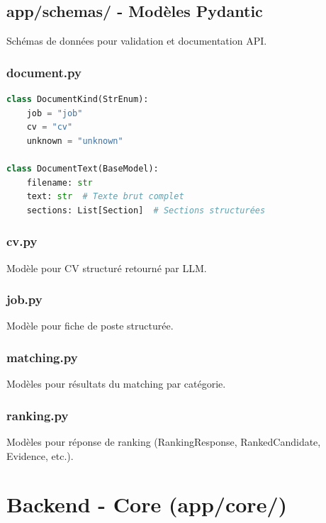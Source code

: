 \documentclass[12pt,a4paper,oneside]{book}
\begin{document}
\subsection{app/schemas/ - Modèles Pydantic}

Schémas de données pour validation et documentation API.

\subsubsection{document.py}

\begin{lstlisting}[language=Python]
class DocumentKind(StrEnum):
    job = "job"
    cv = "cv"
    unknown = "unknown"

class DocumentText(BaseModel):
    filename: str
    text: str  # Texte brut complet
    sections: List[Section]  # Sections structurées
\end{lstlisting}

\subsubsection{cv.py}

Modèle pour CV structuré retourné par LLM.

\subsubsection{job.py}

Modèle pour fiche de poste structurée.

\subsubsection{matching.py}

Modèles pour résultats du matching par catégorie.

\subsubsection{ranking.py}

Modèles pour réponse de ranking (RankingResponse, RankedCandidate, Evidence, etc.).

\newpage


\section{Backend - Core (app/core/)}
\end{document}
